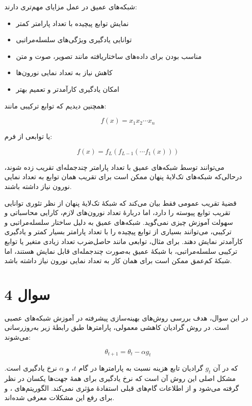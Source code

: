 \documentclass[12pt,a4paper]{article}
\begin{document}
شبکه‌های عمیق در عمل مزایای مهم‌تری دارند:

\begin{itemize}
	\item نمایش توابع پیچیده با تعداد پارامتر کمتر
	\item توانایی یادگیری ویژگی‌های سلسله‌مراتبی
	\item مناسب بودن برای داده‌های ساختاریافته مانند تصویر، صوت و متن
	\item کاهش نیاز به تعداد نمایی نورون‌ها
	\item امکان یادگیری کارآمدتر و تعمیم بهتر
\end{itemize}

همچنین دیدیم که توابع ترکیبی مانند:

\[
f(x)=x_1x_2\cdots x_n
\]

یا توابعی از فرم:

\[
f(x)=f_L(f_{L-1}(\cdots f_1(x)))
\]

می‌توانند توسط شبکه‌های عمیق با تعداد پارامتر چندجمله‌ای تقریب زده شوند، درحالی‌که شبکه‌های تک‌لایهٔ پنهان ممکن است برای تقریب همان توابع به تعداد نمایی نورون نیاز داشته باشند.

\begin{tcolorbox}[
	colback=softgray,
	colframe=mainblue,
	title=پاسخ نهایی فشرده
	]
	قضیهٔ تقریب عمومی فقط بیان می‌کند که شبکهٔ تک‌لایهٔ پنهان از نظر تئوری توانایی تقریب توابع پیوسته را دارد، اما دربارهٔ تعداد نورون‌های لازم، کارایی محاسباتی و سهولت آموزش چیزی نمی‌گوید. شبکه‌های عمیق به دلیل ساختار سلسله‌مراتبی و ترکیبی، می‌توانند بسیاری از توابع پیچیده را با تعداد پارامتر بسیار کمتر و یادگیری کارآمدتر نمایش دهند. برای مثال، توابعی مانند حاصل‌ضرب تعداد زیادی متغیر یا توابع ترکیبی سلسله‌مراتبی، با شبکهٔ عمیق به‌صورت چندجمله‌ای قابل نمایش هستند، اما شبکهٔ کم‌عمق ممکن است برای همان کار به تعداد نمایی نورون نیاز داشته باشد.
\end{tcolorbox}
\section{سوال 4}

در این سوال، هدف بررسی روش‌های بهینه‌سازی پیشرفته در آموزش شبکه‌های عصبی است. در روش گرادیان کاهشی معمولی، پارامترها طبق رابطهٔ زیر به‌روزرسانی می‌شوند:

\[
\theta_{t+1}=\theta_t-\alpha g_t
\]

که در آن \(g_t\) گرادیان تابع هزینه نسبت به پارامترها در گام \(t\)، و \(\alpha\) نرخ یادگیری است. مشکل اصلی این روش آن است که نرخ یادگیری برای همهٔ جهت‌ها یکسان در نظر گرفته می‌شود و از اطلاعات گام‌های قبلی استفادهٔ مؤثری نمی‌کند. الگوریتم‌های ،  و  برای رفع این مشکلات معرفی شده‌اند.
\end{document}
